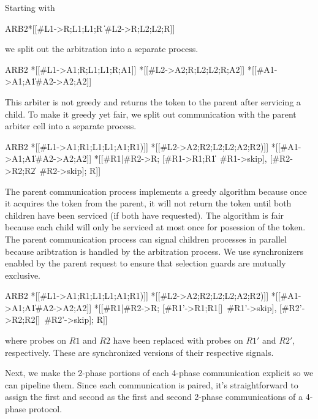 \documentclass{article}
\begin{document}
Starting with

\begin{csp}
ARB2\equiv*
  *[[#{L1}->R;L1;L1;R
    \|#{L2}->R;L2;L2;R]]
\end{csp}

we split out the arbitration into a separate process.

\begin{csp}
ARB2\equiv
*[[#{L1}->A1;R;L1;L1;R;A1]] \pll
*[[#{L2}->A2;R;L2;L2;R;A2]] \pll
*[[#{A1}->A1;A1\|#{A2}->A2;A2]]
\end{csp}

This arbiter is not greedy and returns the token to the parent after servicing a child.
To make it greedy yet fair, we split out communication with the parent arbiter cell into a separate process.

\begin{csp}
ARB2\equiv
  *[[#{L1}->A1;R1;L1;L1;A1;R1)]] \pll
  *[[#{L2}->A2;R2;L2;L2;A2;R2)]] \pll
  *[[#{A1}->A1;A1\|#{A2}->A2;A2]]\pll
  *[[#{R1}|#{R2}->R;
    [#{R1}->R1;R1\|~#{R1}->skip],
    [#{R2}->R2;R2\|~#{R2}->skip];
    R]]
\end{csp}

The parent communication process implements a greedy algorithm because once it acquires the token from the parent,
it will not return the token until both children have been serviced (if both have requested). 
The algorithm is fair because each child will only be serviced at most once for posession of the token.
The parent communication process can signal children processes in parallel because aribtration is handled by the arbitration process.
We use synchronizers enabled by the parent request to ensure that selection guards are mutually exclusive.


\begin{csp}
ARB2\equiv
  *[[#{L1}->A1;R1;L1;L1;A1;R1)]] \pll
  *[[#{L2}->A2;R2;L2;L2;A2;R2)]] \pll
  *[[#{A1}->A1;A1\|#{A2}->A2;A2]]\pll
  *[[#{R1}|#{R2}->R;
    [#{R1'}->R1;R1[]~#{R1'}->skip],
    [#{R2'}->R2;R2[]~#{R2'}->skip];
    R]]
\end{csp}
where probes on $R1$ and $R2$ have been replaced with probes on $R1'$ and $R2'$, respectively. 
These are synchronized versions of their respective signals.

Next, we make the 2-phase portions of each 4-phase communication explicit so we can pipeline them.
Since each communication is paired, it's straightforward to assign the first and second as the first and second
2-phase communications of a 4-phase protocol. 
\end{document}
